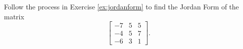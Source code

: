 \begin{exercise}\ansMark%
Follow the process in Exercise \ref{ex:jordanform} to find the Jordan Form of the matrix
\[ \begin{bmatrix} -7 & 5 & 5 \\ -4 & 5 & 7 \\ -6 & 3 & 1 \end{bmatrix}. \]
\end{exercise}
